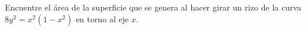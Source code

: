 \item Encuentre el área de la superficie que se genera al hacer girar un rizo de la curva $8y^2 = x^2(1 - x^2)$ en torno al eje $x$.

